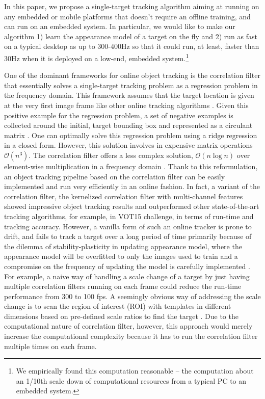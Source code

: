\documentclass{bmvc2k}
\begin{document}
In this paper, we propose a single-target tracking algorithm aiming at
running on any embedded or mobile platforms that doesn't require an
offline training, and can run on an embedded system. In particular, we
would like to make our algorithm 1) learn the appearance model of a
target on the fly and 2) run as fast on a typical desktop as up to
$300$-$400$Hz so that it could run, at least, faster than 30Hz when it
is deployed on a low-end, embedded system.\footnote{We empirically
  found this computation reasonable -- the computation about an 1/10th
  scale down of computational resources from a typical PC to an
  embedded system.}

One of the dominant frameworks for online object tracking is the
correlation filter that essentially solves a single-target tracking
problem as a regression problem in the frequency domain. This
framework assumes that the target location is given at the very first
image frame like other online tracking algorithms
\cite{smeulders2014survey}. Given this positive example for the
regression problem, a set of negative examples is collected around the
initial, target bounding box and represented as a circulant matrix
\cite{henriques2015high}. One can optimally solve this regression
problem using a ridge regression in a closed form. However, this
solution involves in expensive matrix operations
$\mathcal{O}(n^{3})$. The correlation filter offers a less complex
solution, $\mathcal{O}(n\log n)$ over element-wise multiplication in a
frequency domain \cite{bolme2010visual,henriques2015high}. Thank to
this reformulation, an object tracking pipeline based on the
correlation filter can be easily implemented and run very efficiently
in an online fashion. In fact, a variant of the correlation filter,
the kernelized correlation filter with multi-channel features
\cite{henriques2015high} showed impressive object tracking results and
outperformed other state-of-the-art tracking algorithms, for example,
in VOT15 challenge, in terms of run-time and tracking
accuracy. However, a vanilla form of such an online tracker is prone
to drift, and fails to track a target over a long period of time
primarily \cite{henriques2015high} because of the dilemma of
stability-plasticity in updating appearance model, where the
appearance model will be overfitted to only the images used to train
and a compromise on the frequency of updating the model is carefully
implemented \cite{santner2010prost}. For example, a naive way of
handling a scale change of a target by just having multiple
correlation filters running on each frame could reduce the run-time
performance from 300 to 100 fps. A seemingly obvious way of addressing
the scale change is to scan the region of interest (ROI) with
templates in different dimensions based on pre-defined scale ratios to
find the target
\cite{henriques2015high,tang2015multi,ma2015long,bibi2015multi,li2014scale}. Due
to the computational nature of correlation filter, however, this
approach would merely increase the computational complexity because it
has to run the correlation filter multiple times on each frame.
\end{document}

